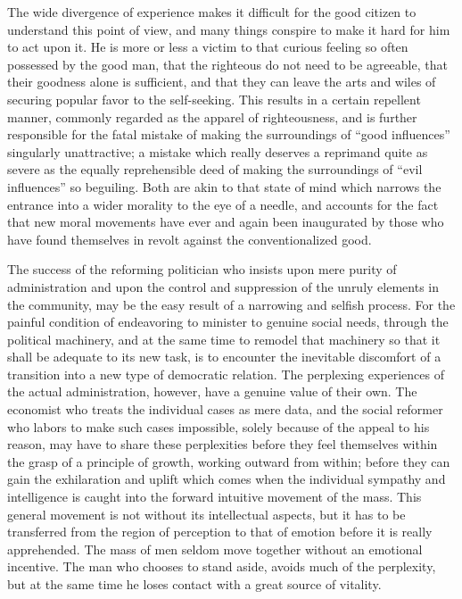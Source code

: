 \documentclass[]{article}
\begin{document}
\begin{sectionbody}
\addamsparagraph The wide divergence of experience makes it difficult for the good
citizen to understand this point of view, and many things conspire to
make it hard for him to act upon it. He is more or less a victim to that
curious feeling so often possessed by the good man, that the righteous
do not need to be agreeable, that their goodness alone is sufficient,
and that they can leave the arts and wiles of securing popular favor to
the self-seeking. This results in a certain repellent manner, commonly
regarded as the apparel of righteousness, and is further responsible for
the fatal mistake of making the surroundings of ``good influences''
singularly unattractive; a mistake which really deserves a reprimand
quite as severe as the equally reprehensible deed of making the
surroundings of ``evil influences'' so beguiling. Both are akin to that
state of mind which narrows the entrance into a wider morality to the
eye of a needle, and accounts for the fact that new moral movements have
ever and again been inaugurated by those who have found themselves in
revolt against the conventionalized good.

\addamsparagraph The success of the reforming politician who insists upon mere purity of
administration and upon the control and suppression of the unruly
elements in the community, may be the easy result of a narrowing and
selfish process. For the painful condition of endeavoring to minister
to genuine social needs, through the political machinery, and at the
same time to remodel that machinery so that it shall be adequate to its
new task, is to encounter the inevitable discomfort of a transition into
a new type of democratic relation. The perplexing experiences of the
actual administration, however, have a genuine value of their own. The
economist who treats the individual cases as mere data, and the social
reformer who labors to make such cases impossible, solely because of the
appeal to his reason, may have to share these perplexities before they
feel themselves within the grasp of a principle of growth, working
outward from within; before they can gain the exhilaration and uplift
which comes when the individual sympathy and intelligence is caught into
the forward intuitive movement of the mass. This general movement is not
without its intellectual aspects, but it has to be transferred from the
region of perception to that of emotion before it is really
apprehended. The mass of men seldom move together without an emotional
incentive. The man who chooses to stand aside, avoids much of the
perplexity, but at the same time he loses contact with a great source of
vitality.


\end{sectionbody}
\end{document}
